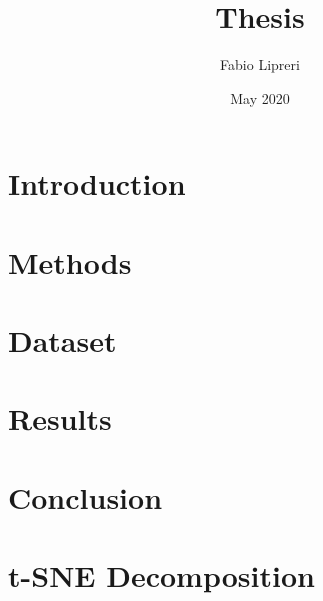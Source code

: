 \documentclass[12pt]{report}
\title{Thesis}
\author{Fabio Lipreri}
\date{May 2020}
\begin{document}
\maketitle

\tableofcontents{}

\chapter{Introduction}


\chapter{Methods} \label{cap:methods}


\chapter{Dataset}


\chapter{Results}


\chapter{Conclusion}


\appendix
\chapter{t-SNE Decomposition} \label{appendix:tsne}


\printbibliography
\end{document}
